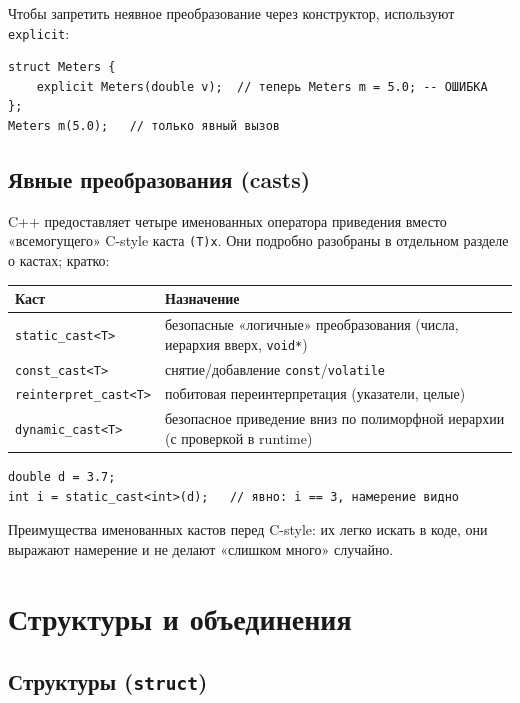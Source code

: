 Чтобы запретить неявное преобразование через конструктор, используют
\texttt{explicit}:

\begin{lstlisting}
struct Meters {
    explicit Meters(double v);  // теперь Meters m = 5.0; -- ОШИБКА
};
Meters m(5.0);   // только явный вызов
\end{lstlisting}

\subsection{Явные преобразования (casts)}

C++ предоставляет четыре именованных оператора приведения вместо «всемогущего»
C-style каста \texttt{(T)x}. Они подробно разобраны в отдельном разделе
о кастах; кратко:

\begin{center}
\begin{tabular}{lp{9.5cm}}
\toprule
\textbf{Каст} & \textbf{Назначение} \\
\midrule
\texttt{static\_cast<T>}      & безопасные «логичные» преобразования (числа, иерархия вверх, \texttt{void*}) \\
\addlinespace
\texttt{const\_cast<T>}       & снятие/добавление \texttt{const}/\texttt{volatile} \\
\addlinespace
\texttt{reinterpret\_cast<T>} & побитовая переинтерпретация (указатели, целые) \\
\addlinespace
\texttt{dynamic\_cast<T>}     & безопасное приведение вниз по полиморфной иерархии (с проверкой в runtime) \\
\bottomrule
\end{tabular}
\end{center}

\begin{lstlisting}
double d = 3.7;
int i = static_cast<int>(d);   // явно: i == 3, намерение видно
\end{lstlisting}

Преимущества именованных кастов перед C-style: их легко искать в коде, они
выражают намерение и не делают «слишком много» случайно.


\section{Структуры и объединения}

\subsection{Структуры (\texttt{struct})}

